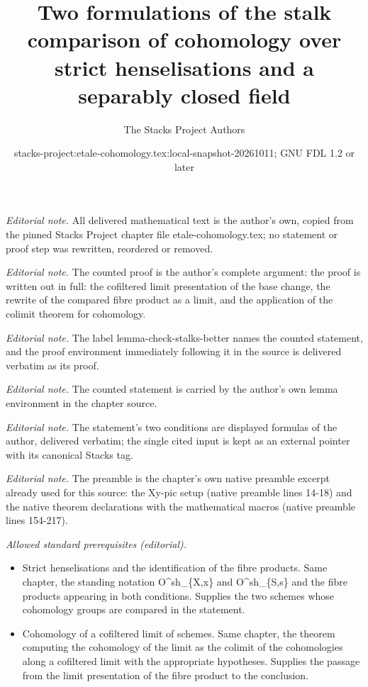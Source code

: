 \documentclass[10pt,a4paper]{amsart}
\title{Two formulations of the stalk comparison of cohomology over strict henselisations and a separably closed field}
\author{The Stacks Project Authors}
\date{stacks-project:etale-cohomology.tex:local-snapshot-20261011; GNU FDL 1.2 or later}
\theoremstyle{plain}
\theoremstyle{definition}
\theoremstyle{remark}
\numberwithin{equation}{subsection}
\begin{document}
\maketitle
\noindent\textit{Editorial note.} All delivered mathematical text is the author's own, copied from the pinned Stacks Project chapter file etale-cohomology.tex; no statement or proof step was rewritten, reordered or removed.\par\medskip
\noindent\textit{Editorial note.} The counted proof is the author's complete argument: the proof is written out in full: the cofiltered limit presentation of the base change, the rewrite of the compared fibre product as a limit, and the application of the colimit theorem for cohomology.\par\medskip
\noindent\textit{Editorial note.} The label lemma-check-stalks-better names the counted statement, and the proof environment immediately following it in the source is delivered verbatim as its proof.\par\medskip
\noindent\textit{Editorial note.} The counted statement is carried by the author's own lemma environment in the chapter source.\par\medskip
\noindent\textit{Editorial note.} The statement's two conditions are displayed formulas of the author, delivered verbatim; the single cited input is kept as an external pointer with its canonical Stacks tag.\par\medskip
\noindent\textit{Editorial note.} The preamble is the chapter's own native preamble excerpt already used for this source: the Xy-pic setup (native preamble lines 14-18) and the native theorem declarations with the mathematical macros (native preamble lines 154-217).\par\medskip
\noindent\textit{Allowed standard prerequisites (editorial).}\begin{itemize}
\item Strict henselisations and the identification of the fibre products. Same chapter, the standing notation O\textasciicircum{}sh\_\{X,x\} and O\textasciicircum{}sh\_\{S,s\} and the fibre products appearing in both conditions. Supplies the two schemes whose cohomology groups are compared in the statement.
\item Cohomology of a cofiltered limit of schemes. Same chapter, the theorem computing the cohomology of the limit as the colimit of the cohomologies along a cofiltered limit with the appropriate hypotheses. Supplies the passage from the limit presentation of the fibre product to the conclusion.
\end{itemize}\medskip
\end{document}
